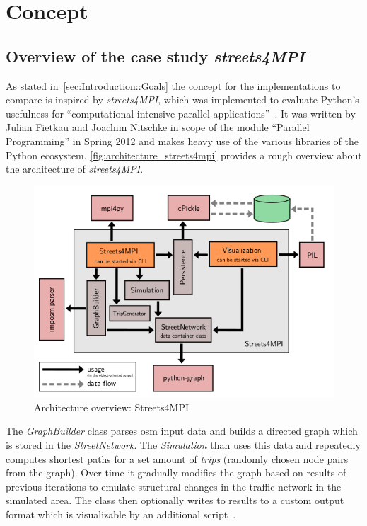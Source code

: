 \chapter{Concept}
\label{ch:Concept}


\section{Overview of the case study \textit{streets4MPI}}
\label{sec:Concept::Overview}

As stated in~\autoref{sec:Introduction::Goals} the concept for the implementations to compare is inspired by \textit{streets4MPI}, which was implemented to evaluate Python's usefulness for ``computational intensive parallel applications''~\cite[p.3]{streets_report}. It was written by Julian Fietkau and Joachim Nitschke in scope of the module ``Parallel Programming'' in Spring 2012 and makes heavy use of the various libraries of the Python ecosystem. \autoref{fig:architecture_streets4mpi} provides a rough overview about the architecture of \textit{streets4MPI}.

\begin{figure}[htb]
    \centering
    \includegraphics[width=.75\textwidth]{img/architecture_streets4mpi.png}
    \caption{Architecture overview: Streets4MPI~\cite[p. 9]{streets_report}}
    \label{fig:architecture_streets4mpi}
\end{figure}

The \textit{GraphBuilder} class parses \gls{osm} input data and builds a directed graph which is stored in the \textit{StreetNetwork}. The \textit{Simulation} than uses this data and repeatedly computes shortest paths for a set amount of \textit{trips} (randomly chosen node pairs from the graph). Over time it gradually modifies the graph based on results of previous iterations to emulate structural changes in the traffic network in the simulated area. The  class then optionally writes to results to a custom output format which is visualizable by an additional script~\cite{streets_report}.

